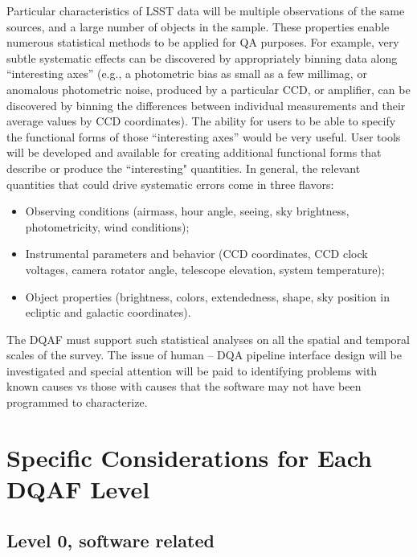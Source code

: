 \documentclass[SE,toc,lsstdraft]{lsstdoc}
\begin{document}
Particular characteristics of LSST data will be multiple observations of the same sources, and a large
number of objects in the sample. These properties enable numerous statistical methods to be applied
for QA purposes. For example, very subtle systematic effects can be discovered by appropriately binning
data along ``interesting axes''  (e.g., a photometric bias as small as a few millimag, or anomalous
photometric noise, produced by a particular CCD, or amplifier, can be discovered by binning the differences
between individual measurements and their average values by CCD coordinates).  The ability for users to be able to specify the functional forms of those ``interesting axes'' would be very useful.   User tools will be developed and available for creating additional functional forms that describe or produce the ``interesting" quantities.  In general, the relevant
quantities that could drive systematic errors come in three flavors:
\begin{itemize}
\item Observing conditions (airmass, hour angle, seeing, sky brightness, photometricity, wind conditions);
\item Instrumental parameters and behavior (CCD coordinates, CCD clock voltages, camera rotator angle, telescope elevation, system
         temperature);
\item Object properties (brightness, colors, extendedness, shape, sky position in ecliptic and galactic coordinates).
\end{itemize}


The DQAF must support such statistical analyses on all the spatial and temporal scales of the survey. The issue of human – DQA pipeline interface design will be investigated and special attention will be paid to identifying problems with known causes vs those with causes that the software may not have been programmed to characterize.




\section{Specific Considerations for Each DQAF Level}


\subsection{Level 0, software related}
\end{document}
